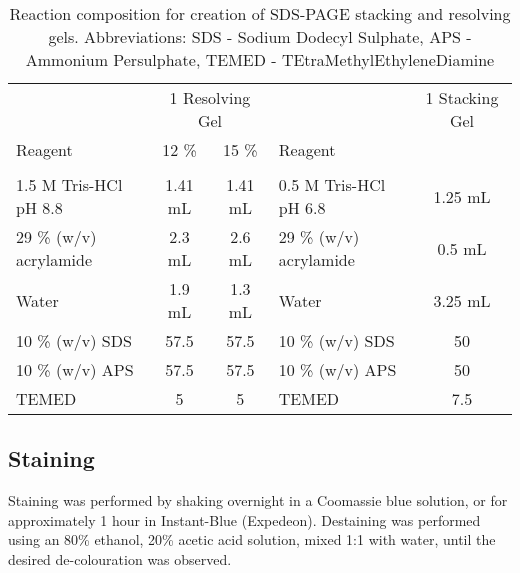 \begin{table}[h]
\centering
\scriptsize
\captionsetup{singlelinecheck=off, justification=justified, font=footnotesize}
\caption[SDS-PAGE reagent composition]{Reaction composition for creation of SDS-PAGE stacking and resolving gels. Abbreviations: SDS - Sodium Dodecyl Sulphate, APS - Ammonium Persulphate, TEMED - TEtraMethylEthyleneDiamine}\label{SDS}


\begin{tabular}[h]{ l c c l c}
                            &  \multicolumn{2}{c}{1 Resolving Gel}       &                                                & 1 Stacking Gel  \\[0.1em]\cmidrule(r{1pt}l{1pt}){1-3}\cmidrule(r{1pt}l{1pt}){4-5}
	 Reagent                           & 12 \%        & 15 \%             &   Reagent                               &    \\[0.2em]
	\hline \\[-0.2em]
	 1.5 M Tris-HCl pH 8.8     &   1.41 mL    &   1.41 mL    &   0.5 M Tris-HCl pH 6.8       &   1.25 mL \\[0.5em]
	 29 \% (w/v) acrylamide  &    2.3 mL     &    2.6 mL      &   29 \% (w/v) acrylamide    &   0.5 mL    \\[0.5em]
	 Water                                 &   1.9 mL      &   1.3 mL       &   Water                                  &   3.25 mL\\[0.5em]
	 10 \% (w/v) SDS               &    57.5\ul    &    57.5\ul     &   10 \% (w/v) SDS                 &    50\ul \\[0.5em]
	 10 \% (w/v) APS               &    57.5\ul    &    57.5\ul      &  10 \% (w/v) APS                 &    50\ul \\[0.5em]
	 TEMED                              &    5\ul          &    5\ul           &   TEMED                                &    7.5\ul \\[0.5em]
\end{tabular}

\end{table}

	
\subsection{Staining}
Staining was performed by shaking overnight in a Coomassie blue solution, or for approximately 1 hour in Instant-Blue (Expedeon). Destaining was performed using an 80\% ethanol, 20\% acetic acid solution, mixed 1:1 with water, until the desired de-colouration was observed.

